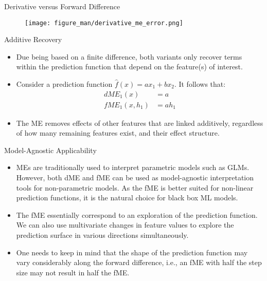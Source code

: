 \documentclass[11pt,compress,t,notes=noshow, aspectratio=169, xcolor=table]{beamer}
\begin{document}
\begin{frame}{Derivative versus Forward Difference}
\begin{figure}
  \texttt{[image: figure\_man/derivative\_me\_error.png]}
\end{figure}
\end{frame}

\begin{frame}{Additive Recovery}

\begin{itemize}
\itemsep2em
\item Due being based on a finite difference, both variants only recover terms within the prediction function that depend on the feature(s) of interest.
\item Consider a prediction function $\widehat{f}(x) = ax_1 + bx_2$. It follows that:
\begin{align*}
dME_1(x) &= a \\
fME_1(x, h_1) &= ah_1
\end{align*}
\item The ME removes effects of other features that are linked additively, regardless of how many remaining features exist, and their effect structure.
\end{itemize}

\end{frame}


\begin{frame}{Model-Agnostic Applicability}

\begin{itemize}
\itemsep2em
\item MEs are traditionally used to interpret parametric models such as GLMs. However, both dME and fME can be used as model-agnostic interpretation tools for non-parametric models. As the fME is better suited for non-linear prediction functions, it is the natural choice for black box ML models.
\item The fME essentially correspond to an exploration of the prediction function. We can also use multivariate changes in feature values to explore the prediction surface in various directions simultaneously.
\item One needs to keep in mind that the shape of the prediction function may vary considerably along the forward difference, i.e., an fME with half the step size may not result in half the fME.
\end{itemize}

\end{frame}
\end{document}
